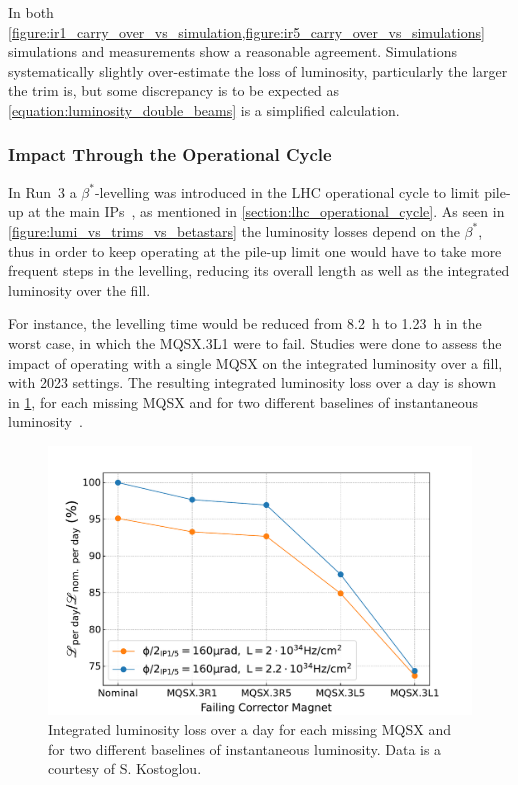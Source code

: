 In both \cref{figure:ir1_carry_over_vs_simulation,figure:ir5_carry_over_vs_simulations} simulations and measurements show a reasonable agreement.
Simulations systematically slightly over-estimate the loss of luminosity, particularly the larger the \gls{trim} is, but some discrepancy is to be expected as \cref{equation:luminosity_double_beams} is a simplified calculation.

\subsubsection*{Impact Through the Operational Cycle}

In Run~\num{3} a \(\beta^{\ast}\)-levelling was introduced in the LHC operational cycle to limit pile-up at the main IPs~\cite{MEETING:Fartoukh:Run3_Configuration}, as mentioned in \cref{section:lhc_operational_cycle}.
As seen in \cref{figure:lumi_vs_trims_vs_betastars} the luminosity losses depend on the \(\beta^{\ast}\), thus in order to keep operating at the pile-up limit one would have to take more frequent steps in the levelling, reducing its overall length as well as the integrated luminosity over the fill.

For instance, the levelling time would be reduced from \qty{8.2}{\hour} to \qty{1.23}{\hour} in the worst case, in which the MQSX.\num{3}L\num{1} were to fail.
Studies were done to assess the impact of operating with a single MQSX on the integrated luminosity over a fill, with \num{2023} settings.
The resulting integrated luminosity loss over a day is shown in \cref{figure:integrated_lumi_losses}, for each missing MQSX and for two different baselines of instantaneous luminosity~\cite{MEETING:Kostoglou:Integrated_Lumi_MQSX_Carryovers}.

\begin{figure}[!htb]
    \centering
    \includegraphics*[width=\textwidth]{Figures/IR_Coupling_Correction/carry_over_integrated_lumi.pdf}
    \caption{Integrated luminosity loss over a day for each missing MQSX and for two different baselines of instantaneous luminosity. Data is a courtesy of S. Kostoglou.}
    \label{figure:integrated_lumi_losses}
\end{figure}

